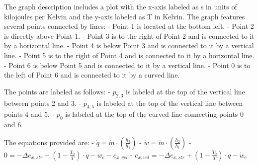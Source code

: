 The graph description includes a plot with the x-axis labeled as s in units of kilojoules per Kelvin and the y-axis labeled as T in Kelvin. The graph features several points connected by lines:
- Point 1 is located at the bottom left.
- Point 2 is directly above Point 1.
- Point 3 is to the right of Point 2 and is connected to it by a horizontal line.
- Point 4 is below Point 3 and is connected to it by a vertical line.
- Point 5 is to the right of Point 4 and is connected to it by a horizontal line.
- Point 6 is below Point 5 and is connected to it by a vertical line.
- Point 0 is to the left of Point 6 and is connected to it by a curved line.

The points are labeled as follows:
- \( p_{2,3} \) is labeled at the top of the vertical line between points 2 and 3.
- \( p_{4,5} \) is labeled at the top of the vertical line between points 4 and 5.
- \( p_0 \) is labeled at the top of the curved line connecting points 0 and 6.

The equations provided are:
- \( \dot{q} = \dot{m} \cdot \left( \frac{h_2}{h_1} \right) \)
- \( \dot{w} = \dot{m} \cdot \left( \frac{h_2}{h_1} \right) \)
- \( 0 = -\Delta e_{x,str} + \left( 1 - \frac{T_0}{T} \right) \cdot \dot{q} - \dot{w}_c - e_{x,vel} \)
- \( e_{x,vel} = -\Delta e_{x,str} + \left( 1 - \frac{T_0}{T} \right) \cdot \dot{q} - \dot{w}_c \)
